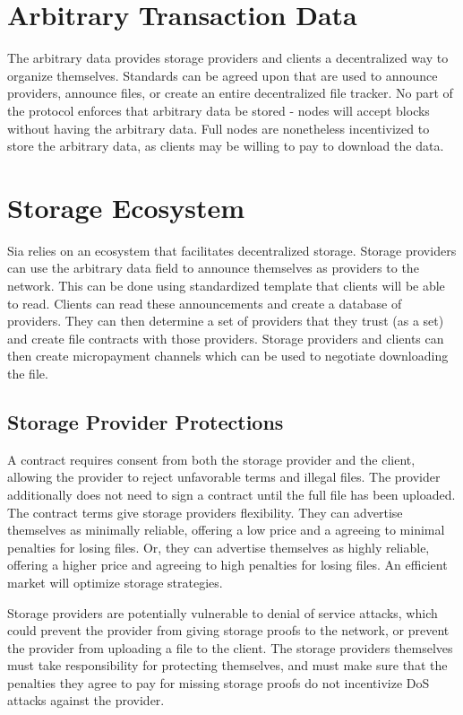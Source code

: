 \documentclass[twocolumn]{article}
\begin{document}
\section{Arbitrary Transaction Data}
The arbitrary data provides storage providers and clients a decentralized way to organize themselves.
Standards can be agreed upon that are used to announce providers, announce files, or create an entire decentralized file tracker.
No part of the protocol enforces that arbitrary data be stored - nodes will accept blocks without having the arbitrary data.
Full nodes are nonetheless incentivized to store the arbitrary data, as clients may be willing to pay to download the data.

\section{Storage Ecosystem}
Sia relies on an ecosystem that facilitates decentralized storage.
Storage providers can use the arbitrary data field to announce themselves as providers to the network.
This can be done using standardized template that clients will be able to read.
Clients can read these announcements and create a database of providers.
They can then determine a set of providers that they trust (as a set) and create file contracts with those providers.
Storage providers and clients can then create micropayment channels \cite{mpc} which can be used to negotiate downloading the file.

\subsection{Storage Provider Protections}
A contract requires consent from both the storage provider and the client, allowing the provider to reject unfavorable terms and illegal files.
The provider additionally does not need to sign a contract until the full file has been uploaded.
The contract terms give storage providers flexibility.
They can advertise themselves as minimally reliable, offering a low price and a agreeing to minimal penalties for losing files.
Or, they can advertise themselves as highly reliable, offering a higher price and agreeing to high penalties for losing files.
An efficient market will optimize storage strategies.

Storage providers are potentially vulnerable to denial of service attacks, which could prevent the provider from giving storage proofs to the network, or prevent the provider from uploading a file to the client.
The storage providers themselves must take responsibility for protecting themselves, and must make sure that the penalties they agree to pay for missing storage proofs do not incentivize DoS attacks against the provider.
\end{document}
